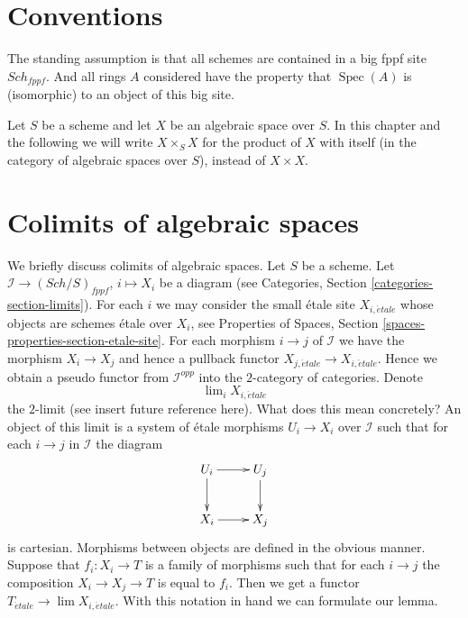 \documentclass{stacks-project}
\theoremstyle{plain}
\theoremstyle{definition}
\theoremstyle{remark}
\numberwithin{equation}{subsection}
\def\lim{\mathop{\mathrm{lim}}\nolimits}
\def\Spec{\mathop{\mathrm{Spec}}}
\def\Sch{\mathit{Sch}}
\def\etale{{\acute{e}tale}}
\begin{document}
\section{Conventions}
\label{section-conventions}

\noindent
The standing assumption is that all schemes are contained in
a big fppf site $\Sch_{fppf}$. And all rings $A$ considered
have the property that $\Spec(A)$ is (isomorphic) to an
object of this big site.

\medskip\noindent
Let $S$ be a scheme and let $X$ be an algebraic space over $S$.
In this chapter and the following we will write $X \times_S X$
for the product of $X$ with itself (in the category of algebraic
spaces over $S$), instead of $X \times X$.




\section{Colimits of algebraic spaces}
\label{section-pushouts-generalities}

\noindent
We briefly discuss colimits of algebraic spaces. Let $S$ be a scheme.
Let $\mathcal{I} \to (\Sch/S)_{fppf}$, $i \mapsto X_i$
be a diagram (see Categories, Section \ref{categories-section-limits}).
For each $i$ we may consider the small \'etale site $X_{i, \etale}$
whose objects are schemes \'etale over $X_i$, see
Properties of Spaces, Section \ref{spaces-properties-section-etale-site}.
For each morphism $i \to j$ of $\mathcal{I}$ we have the morphism
$X_i \to X_j$ and hence a pullback functor
$X_{j, \etale} \to X_{i, \etale}$.
Hence we obtain a pseudo functor from $\mathcal{I}^{opp}$ into
the $2$-category of categories. Denote
$$
\lim_i X_{i, \etale}
$$
the $2$-limit (see insert future reference here). What does this mean
concretely? An object of this limit is a system of \'etale morphisms
$U_i \to X_i$ over $\mathcal{I}$ such that for each $i \to j$ in
$\mathcal{I}$ the diagram
$$
\xymatrix{
U_i \ar[r] \ar[d] & U_j \ar[d] \\
X_i \ar[r] & X_j
}
$$
is cartesian. Morphisms between objects are defined in the obvious manner.
Suppose that $f_i : X_i \to T$ is a family of morphisms such that
for each $i \to j$ the composition $X_i \to X_j \to T$ is equal to $f_i$.
Then we get a functor $T_\etale \to \lim X_{i, \etale}$.
With this notation in hand we can formulate our lemma.
\end{document}
